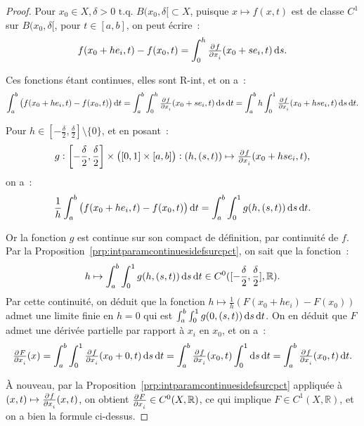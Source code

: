 \documentclass{report}
\theoremstyle{definition}
\theoremstyle{remark}
\numberwithin{equation}{section}
\newcommand{\R}{\mathbb R}
\newcommand{\tq}{\text{ t.q. }}
\begin{document}
			\begin{proof} Pour $x_0 \in X, \delta > 0 \tq B(x_0, \delta[ \subset X$, puisque $x \mapsto f(x, t)$ est de classe $C^1$ sur $B(x_0, \delta[$,
			pour $t \in [a, b]$, on peut écrire~:
			\begin{equation}
				f(x_0 + he_i, t) - f(x_0, t) = \int_0^h \pd f{x_i}(x_0 + se_i, t)\dif s.
			\end{equation}

			Ces fonctions étant continues, elles sont R-int, et on a~:
			\begin{equation}
				\int_a^b\left(f(x_0 + he_i, t) - f(x_0, t)\right)\dif t = \int_a^b\int_0^h \pd f{x_i}(x_0 + se_i, t)\dif s\dif t
				= \int_a^b h\int_0^1\pd f{x_i}(x_0 + hse_i, t)\dif s\dif t.
			\end{equation}

			Pour $h \in \left[-\frac \delta2, \frac \delta2\right] \setminus \{0\}$, et en posant~:
			\begin{equation}
				g : \left[-\frac \delta2, \frac \delta2\right] \times \left([0, 1] \times [a, b]\right) : (h, (s, t)) \mapsto \pd f{x_i}(x_0 + hse_i, t),
			\end{equation}
			on a~:
			\begin{equation}
				\frac 1h\int_a^b \left(f(x_0 + he_i, t) - f(x_0, t)\right)\dif t = \int_a^b\int_0^1g(h, (s, t))\dif s\dif t.
			\end{equation}

			Or la fonction $g$ est continue sur son compact de définition, par continuité de $f$. Par la Proposition~\ref{prp:intparamcontinuesidefsurcpct}, on
			sait que la fonction~:
			\begin{equation}
				h \mapsto \int_a^b\int_0^1g(h, (s, t))\dif s\dif t \in C^0([-\frac \delta2, \frac \delta2], \R).
			\end{equation}
			Par cette continuité, on déduit que la fonction $h \mapsto \frac 1h\left(F(x_0 + he_i) - F(x_0)\right)$ admet une limite finie en $h=0$ qui est
			$\int_a^b\int_0^1g(0, (s, t))\dif s\dif t$. On en déduit que $F$ admet une dérivée partielle par rapport à $x_i$ en $x_0$, et on a~:
			\begin{equation}
				\pd F{x_i}(x) = \int_a^b\int_0^1\pd f{x_i}(x_0 + 0, t)\dif s\dif t = \int_a^b\pd f{x_i}(x_0, t)\int_0^1\dif s\dif t = \int_a^b\pd f{x_i}(x_0, t)\dif t.
			\end{equation}

			À nouveau, par la Proposition~\ref{prp:intparamcontinuesidefsurcpct} appliquée à $(x, t) \mapsto \pd f{x_i}(x, t)$, on obtient
			$\pd F{x_i} \in C^0(X, \R)$, ce qui implique $F \in C^1(X, \R)$, et on a bien la formule ci-dessus.
			\end{proof}
\end{document}
